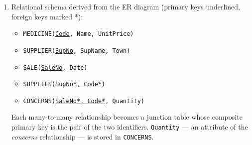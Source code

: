 \documentclass[11pt]{article}
\begin{document}
\begin{corrige}
\begin{enumerate}
\item Relational schema derived from the ER diagram (primary keys underlined, foreign keys marked *):
\begin{itemize}
\item \texttt{MEDICINE(\underline{Code}, Name, UnitPrice)}
\item \texttt{SUPPLIER(\underline{SupNo}, SupName, Town)}
\item \texttt{SALE(\underline{SaleNo}, Date)}
\item \texttt{SUPPLIES(\underline{SupNo*, Code*})}
\item \texttt{CONCERNS(\underline{SaleNo*, Code*}, Quantity)}
\end{itemize}
Each many-to-many relationship becomes a junction table whose composite primary key is the pair of the two identifiers. \texttt{Quantity} — an attribute of the \emph{concerns} relationship — is stored in \texttt{CONCERNS}.
\end{enumerate}
\end{corrige}
\end{document}
